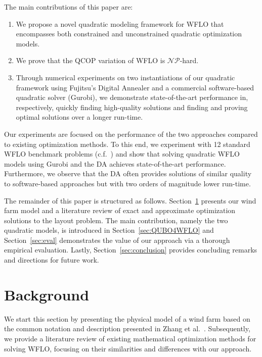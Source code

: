 \documentclass[preprint,12pt]{elsarticle}
\begin{document}
The main
contributions of this paper are:
\begin{enumerate} 
\item We propose a novel quadratic modeling framework for WFLO that encompasses both constrained and unconstrained quadratic optimization models.
\item We prove that the QCOP variation of WFLO is $\mathcal{NP}$-hard.
\item Through numerical experiments on two instantiations of our quadratic framework using Fujitsu's Digital Annealer and a commercial software-based quadratic solver (Gurobi), we demonstrate state-of-the-art performance in, respectively, quickly finding high-quality solutions and finding and proving optimal solutions over a longer run-time.
\end{enumerate}

Our experiments are focused on the performance of the two approaches
compared to 
existing optimization methods. To this end,
we experiment with 12 standard WFLO benchmark problems (c.f.~\cite{turner2014new})
and show that solving quadratic WFLO models
using Gurobi and the DA
achieves state-of-the-art performance.
Furthermore, we observe that the DA often provides solutions of
similar quality to software-based approaches but with two orders of
magnitude lower run-time.

The remainder of this paper is structured as follows. Section~\ref{sec:related} presents our wind farm model and a literature review of exact and approximate
optimization solutions to the layout problem. The main contribution, namely the two quadratic models, is introduced in Section~\ref{sec:QUBO4WFLO} and Section~\ref{sec:eval} demonstrates the value of our approach via a thorough empirical evaluation.
Lastly, Section~\ref{sec:conclusion} provides concluding remarks and directions for future work.   


\section{Background}
\label{sec:related}

We start this section by presenting the physical model of a wind farm
based on the common
notation and description presented in Zhang et al.\ \cite{Zhang2014}.  Subsequently,
we provide a literature review of existing mathematical optimization
methods for solving WFLO, focusing on their similarities and
differences with our approach.
 
\end{document}
